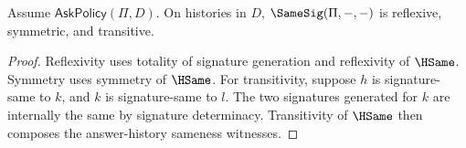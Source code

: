 \begin{theorem}
\label{thm:proof-sprint-signature-sameness-equivalence-under-policy}
Assume \(\mathsf{AskPolicy}(\Pi,D)\).  On histories in \(D\), \(\SameSig(\Pi,-,-)\) is reflexive, symmetric, and transitive.
\end{theorem}
\begin{proof}
Reflexivity uses totality of signature generation and reflexivity of \(\HSame\).  Symmetry uses symmetry of \(\HSame\).  For transitivity, suppose \(h\) is signature-same to \(k\), and \(k\) is signature-same to \(l\).  The two signatures generated for \(k\) are internally the same by signature determinacy.  Transitivity of \(\HSame\) then composes the answer-history sameness witnesses.
\end{proof}
